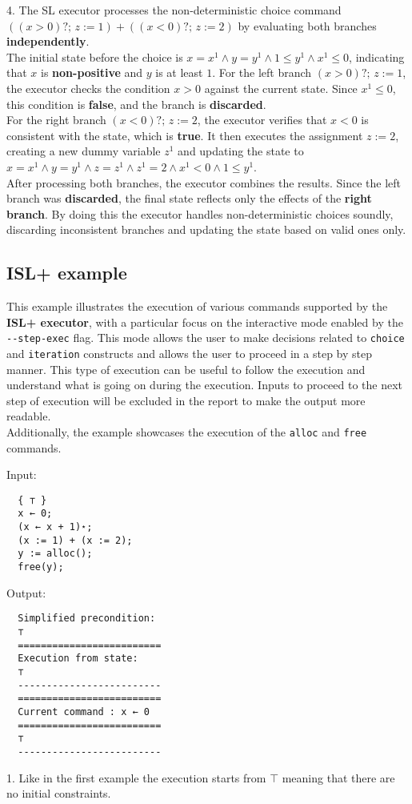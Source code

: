 \documentclass[parskip=half]{scrartcl}
\begin{document}
4. The SL executor processes the non-deterministic choice command $((x > 0)?;\, z := 1) + ((x < 0)?;\, z := 2)$ by evaluating both branches \textbf{independently}. \\The initial state before the choice is $x = x^1 ∧ y = y^1 ∧ 1 \leq y^1 ∧ x^1 \leq 0$, indicating that $x$ is \textbf{non-positive} and $y$ is at least $1$. For the left branch $(x > 0)?;\, z := 1$, the executor checks the condition $x > 0$ against the current state. Since $x^1 \leq 0$, this condition is \textbf{false}, and the branch is \textbf{discarded}. 
\\For the right branch $(x < 0)?;\, z := 2$, the executor verifies that $x < 0$ is consistent with the state, which is \textbf{true}. It then executes the assignment $z := 2$, creating a new dummy variable $z^1$ and updating the state to $x = x^1 ∧ y = y^1 ∧ z = z^1 ∧ z^1 = 2 ∧ x^1 < 0 ∧ 1 \leq y^1$. 
\\After processing both branches, the executor combines the results. Since the left branch was \textbf{discarded}, the final state reflects only the effects of the \textbf{right branch}. By doing this the executor handles non-deterministic choices soundly, discarding inconsistent branches and updating the state based on valid ones only.

\subsection{ISL+ example}
This example illustrates the execution of various commands supported by the \textbf{ISL+ executor}, with a particular focus on the interactive mode enabled by the \verb|--step-exec| flag. This mode allows the user to make decisions related to \texttt{choice} and \texttt{iteration} constructs and allows the user to proceed in a step by step manner. This type of execution can be useful to follow the execution and understand what is going on during the execution. Inputs to proceed to the next step of execution will be excluded in the report to make the output more readable.
\\ Additionally, the example showcases the execution of the \texttt{alloc} and \texttt{free} commands.

Input: 
\begin{verbatim}
  { ⊤ }
  x ← 0;
  (x ← x + 1)⋆;
  (x := 1) + (x := 2);
  y := alloc();
  free(y);
\end{verbatim}

Output: 
\begin{verbatim}
  Simplified precondition:              
  ⊤
  =========================
  Execution from state:
  ⊤
  -------------------------
  =========================
  Current command : x ← 0
  =========================
  ⊤
  -------------------------
\end{verbatim}
1. Like in the first example the execution starts from $\top$ meaning that there are no
initial constraints.
\end{document}
